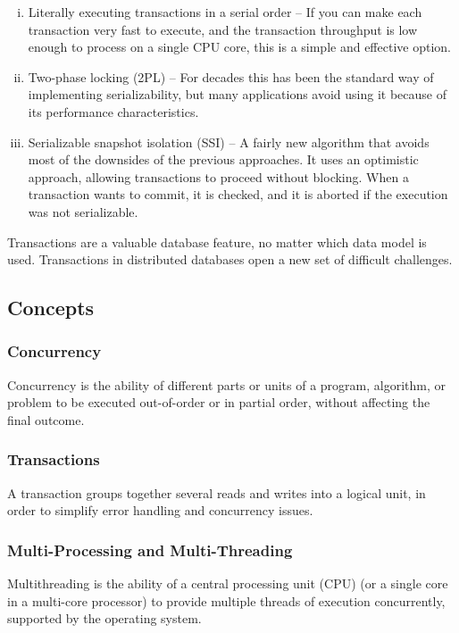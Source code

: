 \documentclass{article}
\begin{document}
    \begin{enumerate}[i.]
        \item Literally executing transactions in a serial order -- If you can make each transaction very fast to execute, and the transaction throughput is low enough to process on a single CPU core, this is a simple and effective option.
        
        \item  Two-phase locking (2PL) --  For decades this has been the standard way of implementing serializability, but  many applications avoid using it because of its performance characteristics.
        
        \item Serializable snapshot isolation (SSI) -- A fairly new algorithm that avoids most of the downsides of the previous approaches. It uses an optimistic approach, allowing transactions to proceed without blocking. When a transaction wants to commit, it is checked, and it is aborted if the execution was not serializable.
        
    \end{enumerate}
    
    Transactions are a valuable database feature, no matter which data model is used. Transactions in distributed databases open a new set of difficult challenges.
    
    \subsection{Concepts}
    \subsubsection{Concurrency}
    Concurrency is the ability of different parts or units of a program, algorithm, or problem to be executed out-of-order or in partial order, without affecting the final outcome.
    
    \subsubsection{Transactions}
    A transaction groups together several reads and writes into a logical unit, in order to simplify error handling and concurrency issues.
    
    \subsubsection{Multi-Processing and Multi-Threading}
    Multithreading is the ability of a central processing unit (CPU) (or a single core in a multi-core processor) to provide multiple threads of execution concurrently, supported by the operating system.
    
\end{document}
